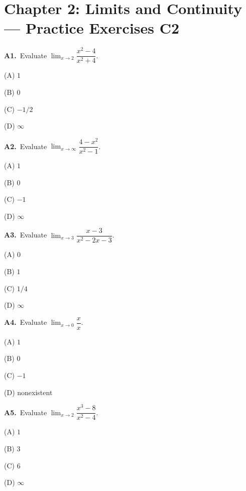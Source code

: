 \documentclass[11pt]{article}
\begin{document}
\section*{Chapter 2: Limits and Continuity --- Practice Exercises C2}

\bigskip\noindent\textbf{A1.}\ Evaluate $\displaystyle\lim_{x\to 2}\dfrac{x^2-4}{x^2+4}$.
\begin{list}{}{\setlength{\leftmargin}{3em}\setlength{\labelwidth}{2.5em}\setlength{\itemsep}{0pt}\setlength{\topsep}{2pt}}
\item[(A)] $1$
\item[(B)] $0$
\item[(C)] $-1/2$
\item[(D)] $\infty$
\end{list}

\bigskip\noindent\textbf{A2.}\ Evaluate $\displaystyle\lim_{x\to \infty}\dfrac{4-x^2}{x^2-1}$.
\begin{list}{}{\setlength{\leftmargin}{3em}\setlength{\labelwidth}{2.5em}\setlength{\itemsep}{0pt}\setlength{\topsep}{2pt}}
\item[(A)] $1$
\item[(B)] $0$
\item[(C)] $-1$
\item[(D)] $\infty$
\end{list}

\bigskip\noindent\textbf{A3.}\ Evaluate $\displaystyle\lim_{x\to 3}\dfrac{x-3}{x^2-2x-3}$.
\begin{list}{}{\setlength{\leftmargin}{3em}\setlength{\labelwidth}{2.5em}\setlength{\itemsep}{0pt}\setlength{\topsep}{2pt}}
\item[(A)] $0$
\item[(B)] $1$
\item[(C)] $1/4$
\item[(D)] $\infty$
\end{list}

\bigskip\noindent\textbf{A4.}\ Evaluate $\displaystyle\lim_{x\to 0}\dfrac{x}{x}$.
\begin{list}{}{\setlength{\leftmargin}{3em}\setlength{\labelwidth}{2.5em}\setlength{\itemsep}{0pt}\setlength{\topsep}{2pt}}
\item[(A)] $1$
\item[(B)] $0$
\item[(C)] $-1$
\item[(D)] nonexistent
\end{list}

\bigskip\noindent\textbf{A5.}\ Evaluate $\displaystyle\lim_{x\to 2}\dfrac{x^3-8}{x^2-4}$.
\begin{list}{}{\setlength{\leftmargin}{3em}\setlength{\labelwidth}{2.5em}\setlength{\itemsep}{0pt}\setlength{\topsep}{2pt}}
\item[(A)] $1$
\item[(B)] $3$
\item[(C)] $6$
\item[(D)] $\infty$
\end{list}
\end{document}
